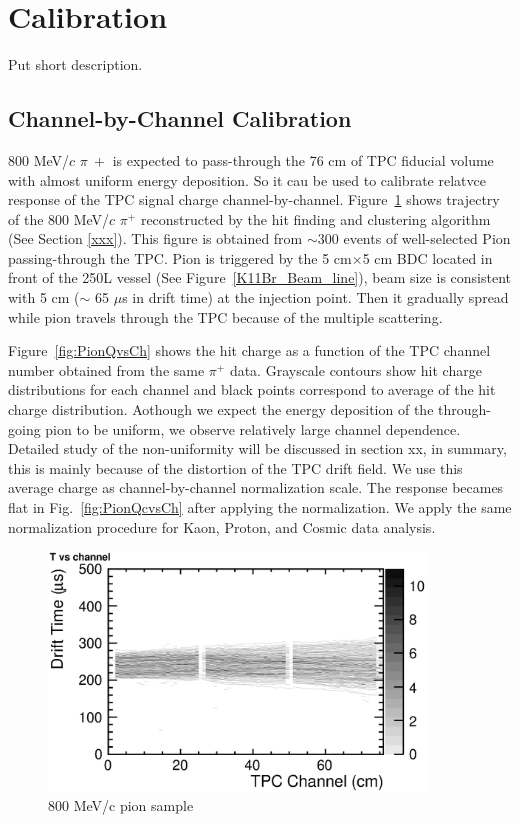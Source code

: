 \section{Calibration}
Put short description.

\subsection{Channel-by-Channel Calibration}

800 MeV/$c$ $\pi~+$ is expected to pass-through the 76 cm
of TPC fiducial volume with almost uniform energy deposition.
So it cau be used to calibrate relatvce response of the TPC
signal charge channel-by-channel. 
Figure~\ref{fig:PionTrack} shows trajectry of the 800 MeV/$c$ $\pi^+$
reconstructed by the hit finding and clustering algorithm (See Section \ref{xxx}).
This figure is obtained from $\sim$300 events of well-selected Pion passing-through the TPC.
Pion is triggered by the 5 cm$\times$5 cm BDC located in front of the 250L vessel (See Figure~\ref{K11Br_Beam_line}), 
beam size is consistent with 5 cm ($\sim$ 65 $\mu$s in drift time) at the injection point.
Then it gradually spread while pion travels through the TPC because of the multiple scattering.

Figure~\ref{fig:PionQvsCh} shows the hit charge as a function of the TPC channel number
obtained from the same $\pi^+$ data. Grayscale contours show hit charge distributions for
each channel and black points correspond to average of the hit charge distribution.  
Aothough we expect the energy deposition of the through-going pion to be uniform,
we observe relatively large channel dependence. 
Detailed study of the non-uniformity will be discussed in section xx, in summary,  
this is mainly because of the distortion of the TPC drift field.
We use this average charge as channel-by-channel normalization scale.
The response becames flat in Fig.~\ref{fig:PionQcvsCh} after applying the normalization.
We apply the same normalization procedure for Kaon, Proton, and Cosmic data analysis.


\begin{figure}[htbp]
 \begin{center}
  \includegraphics[width=100mm]{fig/PionTrack.eps}
 \end{center}
 \caption{800 MeV/c pion sample}
 \label{fig:PionTrack}
\end{figure}

